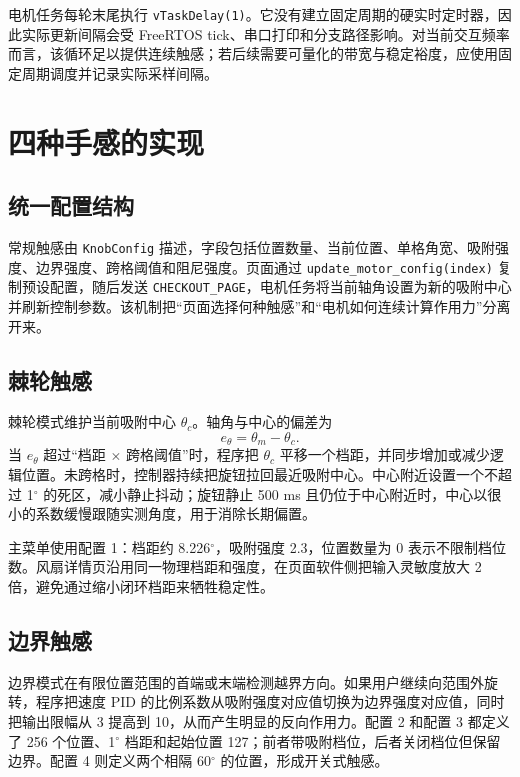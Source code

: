 电机任务每轮末尾执行 \texttt{vTaskDelay(1)}。它没有建立固定周期的硬实时定时器，因此实际更新间隔会受 FreeRTOS tick、串口打印和分支路径影响。对当前交互频率而言，该循环足以提供连续触感；若后续需要可量化的带宽与稳定裕度，应使用固定周期调度并记录实际采样间隔。


\section{四种手感的实现}

\subsection{统一配置结构}

常规触感由 \texttt{KnobConfig} 描述，字段包括位置数量、当前位置、单格角宽、吸附强度、边界强度、跨格阈值和阻尼强度。页面通过 \texttt{update\_motor\_config(index)} 复制预设配置，随后发送 \texttt{CHECKOUT\_PAGE}，电机任务将当前轴角设置为新的吸附中心并刷新控制参数。该机制把“页面选择何种触感”和“电机如何连续计算作用力”分离开来。

\subsection{棘轮触感}

棘轮模式维护当前吸附中心 $\theta_c$。轴角与中心的偏差为
\begin{equation}
e_\theta=\theta_m-\theta_c.
\end{equation}
当 $e_\theta$ 超过“档距 $\times$ 跨格阈值”时，程序把 $\theta_c$ 平移一个档距，并同步增加或减少逻辑位置。未跨格时，控制器持续把旋钮拉回最近吸附中心。中心附近设置一个不超过 1$^\circ$ 的死区，减小静止抖动；旋钮静止 500 ms 且仍位于中心附近时，中心以很小的系数缓慢跟随实测角度，用于消除长期偏置。

主菜单使用配置 1：档距约 8.226$^\circ$，吸附强度 2.3，位置数量为 0 表示不限制档位数。风扇详情页沿用同一物理档距和强度，在页面软件侧把输入灵敏度放大 2 倍，避免通过缩小闭环档距来牺牲稳定性。

\subsection{边界触感}

边界模式在有限位置范围的首端或末端检测越界方向。如果用户继续向范围外旋转，程序把速度 PID 的比例系数从吸附强度对应值切换为边界强度对应值，同时把输出限幅从 3 提高到 10，从而产生明显的反向作用力。配置 2 和配置 3 都定义了 256 个位置、1$^\circ$ 档距和起始位置 127；前者带吸附档位，后者关闭档位但保留边界。配置 4 则定义两个相隔 60$^\circ$ 的位置，形成开关式触感。

